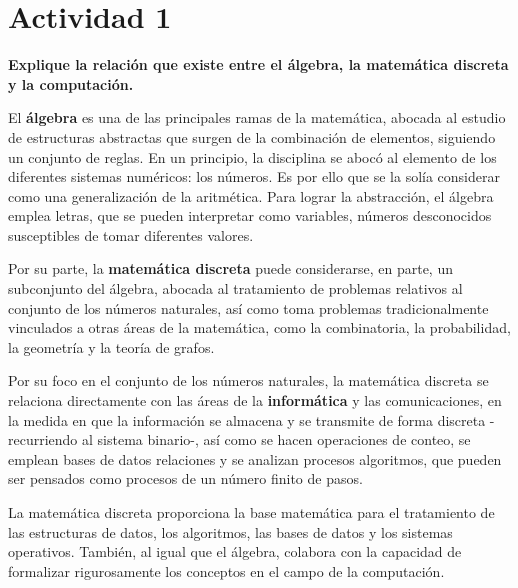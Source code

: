 \section*{Actividad 1}
\textbf{Explique la relación que existe entre el álgebra, la matemática discreta y la computación.}

El \textbf{álgebra} es una de las principales ramas de la matemática, abocada al estudio de estructuras abstractas que surgen de la combinación de elementos, siguiendo un conjunto de reglas. En un principio, la disciplina se abocó al elemento de los diferentes sistemas numéricos: los números. Es por ello que se la solía considerar como una generalización de la aritmética. Para lograr la abstracción, el álgebra emplea letras, que se pueden interpretar como variables, números desconocidos susceptibles de tomar diferentes valores. 

Por su parte, la \textbf{matemática discreta} puede considerarse, en parte, un subconjunto del álgebra, abocada al tratamiento de problemas relativos al conjunto de los números naturales, así como toma problemas tradicionalmente vinculados a otras áreas de la matemática, como la combinatoria, la probabilidad, la geometría y la teoría de grafos. 

Por su foco en el  conjunto de los números naturales, la matemática discreta se relaciona directamente con las áreas de la \textbf{informática} y las comunicaciones, en la medida en que la información se almacena y se transmite de forma discreta -recurriendo al sistema binario-, así como se hacen operaciones de conteo, se emplean bases de datos relaciones y se analizan procesos algoritmos, que pueden ser pensados como procesos de un número finito de pasos. 

La matemática discreta proporciona la base matemática para el tratamiento de las estructuras de datos, los algoritmos, las bases de datos y los sistemas operativos. También, al igual que el álgebra, colabora con la capacidad de formalizar rigurosamente los conceptos en el campo de la computación.
